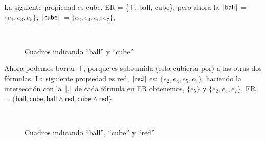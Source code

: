 La siguiente propiedad es \textsf{cube}, ER = \{$\top$, \textsf{ball}, \textsf{cube}\}, pero ahora la $|\!|\textsf{ball}|\!|$ = $\{e_1, e_3, e_5\}$, $|\!|\textsf{cube}|\!|$ = $\{e_2, e_4, e_6, e_7\}$,
\begin{figure}[ht]
\begin{center}
\\[0pt]
\caption{Cuadros indicando ``ball'' y ``cube''}
\label{fig-modelo4}
\end{center}
\end{figure}
Ahora podemos borrar $\top$, porque es subsumida (esta cubierta por) a las otras dos f\'ormulas. La siguiente propiedad es  \textsf{red}, $|\!|\textsf{red}|\!|$ es: $\{e_2, e_4, e_5, e_7\}$, haciendo la intersecci\'on con la $|\!|.|\!|$ de cada f\'ormula en ER obtenemos, $\{e_5\}$ y $\{e_2, e_4, e_7\}$, ER = $\{\textsf{ball}, \textsf{cube}, \textsf{ball} \wedge \textsf{red}, \textsf{cube} \wedge \textsf{red}\}$

\begin{figure}[ht]
\begin{center}
\\[0pt]
\caption{Cuadros indicando ``ball'', ``cube'' y ``red''}
\label{fig-modelo9}
\end{center}
\end{figure}

